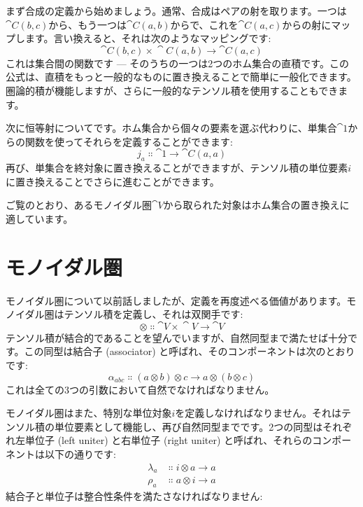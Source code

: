 まず合成の定義から始めましょう。通常、合成はペアの射を取ります。一つは$\cat{C}(b, c)$から、もう一つは$\cat{C}(a, b)$からで、これを$\cat{C}(a, c)$からの射にマップします。言い換えると、それは次のようなマッピングです: 
\[\cat{C}(b, c)\times{}\cat{C}(a, b) \to \cat{C}(a, c)\]
これは集合間の関数です --- そのうちの一つは2つのホム集合の直積です。この公式は、直積をもっと一般的なものに置き換えることで簡単に一般化できます。圏論的積が機能しますが、さらに一般的なテンソル積を使用することもできます。

次に恒等射についてです。ホム集合から個々の要素を選ぶ代わりに、単集合$\cat{1}$からの関数を使ってそれらを定義することができます: 
\[j_a \Colon \cat{1} \to \cat{C}(a, a)\]
再び、単集合を終対象に置き換えることができますが、テンソル積の単位要素$i$に置き換えることでさらに進むことができます。

ご覧のとおり、あるモノイダル圏$\cat{V}$から取られた対象はホム集合の置き換えに適しています。

\section{モノイダル圏}

モノイダル圏について以前話しましたが、定義を再度述べる価値があります。モノイダル圏はテンソル積を定義し、それは双関手です: 
\[\otimes \Colon \cat{V}\times{}\cat{V} \to \cat{V}\]
テンソル積が結合的であることを望んでいますが、自然同型まで満たせば十分です。この同型は結合子 (associator) と呼ばれ、そのコンポーネントは次のとおりです: 
\[\alpha_{a b c} \Colon (a \otimes b) \otimes c \to a \otimes (b \otimes c)\]
これは全ての3つの引数において自然でなければなりません。

モノイダル圏はまた、特別な単位対象$i$を定義しなければなりません。それはテンソル積の単位要素として機能し、再び自然同型までです。2つの同型はそれぞれ左単位子 (left uniter) と右単位子 (right uniter) と呼ばれ、それらのコンポーネントは以下の通りです: 
\begin{align*}
  \lambda_a & \Colon i \otimes a \to a \\
  \rho_a    & \Colon a \otimes i \to a
\end{align*}
結合子と単位子は整合性条件を満たさなければなりません: 

\begin{figure}[H]
  \centering
\end{figure}

